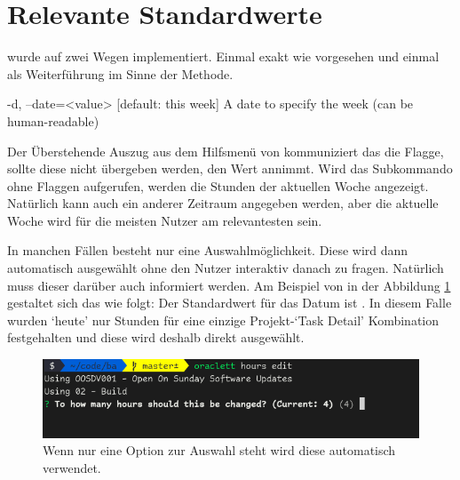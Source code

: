 \documentclass[oneside,bibliography=totocnumbered,BCOR=5mm]{scrbook}
\newenvironment{code}{\captionsetup{type=listing, skip=0pt}}{}
\begin{document}
\section{Relevante Standardwerte}
\label{sec:impl_defaults}

 wurde auf zwei Wegen implementiert. Einmal exakt wie
vorgesehen und einmal als Weiterführung im Sinne der Methode.

\medskip
\smallskip
\begin{code}
  \begin{shellcode}
-d, --date=<value>  [default: this week] A date to specify the week
                    (can be human-readable)
  \end{shellcode}
  \medskip
\end{code}

Der Überstehende Auszug aus dem Hilfsmenü von 
kommuniziert das die  Flagge, sollte diese nicht übergeben
werden, den Wert  annimmt. Wird das Subkommando
 ohne Flaggen aufgerufen, werden die Stunden der aktuellen
Woche angezeigt. Natürlich kann auch ein anderer Zeitraum angegeben werden, aber
die aktuelle Woche wird für die meisten Nutzer am relevantesten sein.

\bigskip

In manchen Fällen besteht nur eine Auswahlmöglichkeit. Diese wird dann
automatisch ausgewählt ohne den Nutzer interaktiv danach zu fragen. Natürlich
muss dieser darüber auch informiert werden. Am Beispiel von  in der Abbildung \ref{fig:hours-edit-defaults} gestaltet sich das wie
folgt: Der Standardwert für das Datum ist . In diesem Falle
wurden `heute' nur Stunden für eine einzige Projekt-`Task Detail' Kombination
festgehalten und diese wird deshalb direkt ausgewählt.

\begin{figure}[H]
  \centering
  \includegraphics[scale=0.6]{hours-edit-defaults.png}
  \caption{Wenn nur eine Option zur Auswahl steht wird diese automatisch verwendet.}
  \label{fig:hours-edit-defaults}
\end{figure}
\end{document}

